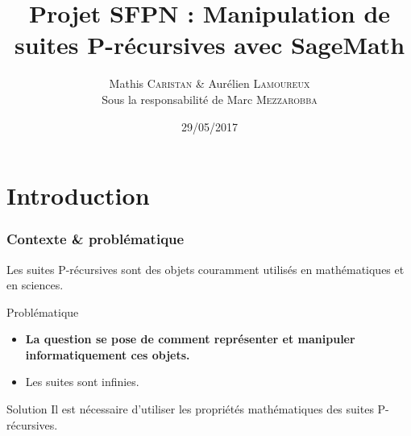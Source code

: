 \documentclass{beamer}
\title[Suites P-récursives]{Projet SFPN : Manipulation de suites P-récursives avec SageMath}
\author[M. Caristan \& A. Lamoureux]{Mathis \textsc{Caristan} \& Aurélien \textsc{Lamoureux}\\
{\scriptsize Sous la responsabilité de Marc \textsc{Mezzarobba}}}
\institute[UPMC]{Université Pierre \& Marie Curie}
\date{29/05/2017}
\begin{document}
\begin{frame}
\titlepage %
\end{frame}

\begin{frame}
\tableofcontents %
\end{frame}

\section{Introduction}%

\begin{frame}
\frametitle{Contexte \& problématique}
\begin{center}
Les suites P-récursives sont des objets couramment utilisés en mathématiques et en sciences.
\begin{alertblock}{Problématique}
    \begin{itemize}
        \item \textbf{\large La question se pose de comment représenter et manipuler
                informatiquement ces objets.}
        \item Les suites sont infinies.
    \end{itemize}
\end{alertblock}
\pause
\begin{exampleblock}{Solution}
    Il est nécessaire d'utiliser les propriétés mathématiques des suites P-récursives.
\end{exampleblock}
\end{center}
\end{frame}
        
\end{document}
